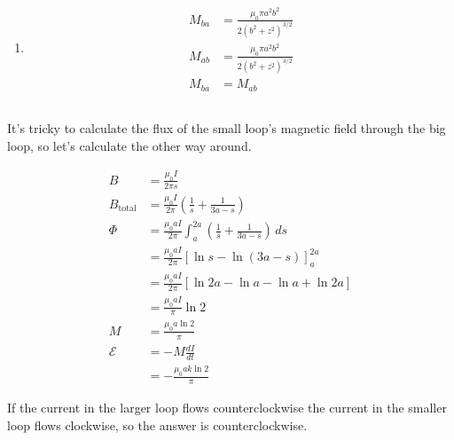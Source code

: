 \documentclass{article}
\begin{document}
\begin{enumerate}
  \item

        \begin{align*}
          M_{b a} & = \frac{\mu_0 \pi a^2 b^2}{2 (b^2 + z^2)^{3 / 2}} \\
          M_{a b} & = \frac{\mu_0 \pi a^2 b^2}{2 (b^2 + z^2)^{3 / 2}} \\
          M_{b a} & = M_{a b}
        \end{align*}
\end{enumerate}

\subsection{}

It's tricky to calculate the flux of the small loop's magnetic field through the big loop, so let's calculate the other way around.

\begin{align*}
  B              & = \frac{\mu_0 I}{2 \pi s}                                                                   \\
  B_\text{total} & = \frac{\mu_0 I}{2 \pi} \left( \frac{1}{s} + \frac{1}{3 a - s} \right)                      \\
  \Phi           & = \frac{\mu_0 a I}{2 \pi} \int_a^{2 a} \left( \frac{1}{s} + \frac{1}{3 a - s} \right) \,d s \\
                 & = \frac{\mu_0 a I}{2 \pi} [\ln s - \ln (3 a - s)]_a^{2 a}                                   \\
                 & = \frac{\mu_0 a I}{2 \pi} [\ln 2 a - \ln a - \ln a + \ln 2 a]                               \\
                 & = \frac{\mu_0 a I}{\pi} \ln 2                                                               \\
  M              & = \frac{\mu_0 a \ln 2}{\pi}                                                                 \\
  \mathcal{E}    & = -M \frac{d I}{d t}                                                                        \\
                 & = -\frac{\mu_0 a k \ln 2}{\pi}
\end{align*}

If the current in the larger loop flows counterclockwise the current in the smaller loop flows clockwise, so the answer is counterclockwise.

\subsection{}
\end{document}
